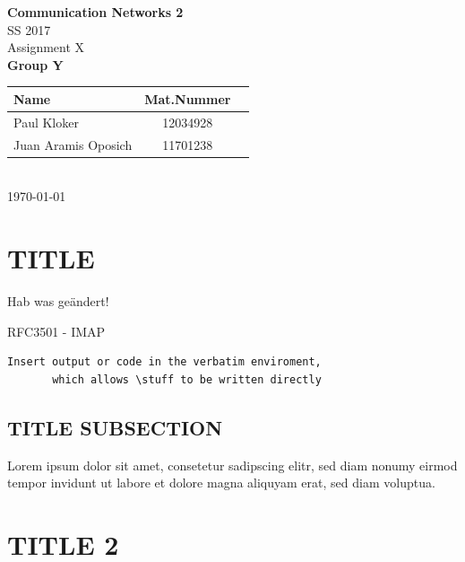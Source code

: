 \documentclass[parskip=full]{scrartcl}
\begin{document}
\begin{titlepage}
    \centering
    \vspace*{2cm}
    {\Huge \textbf{Communication Networks 2}}\\
    SS 2017\\
    \vspace*{1cm}
    {\Large Assignment X}
    \\\vspace*{3cm}
    {\Large \textbf{Group Y}}\\
    \vspace*{1cm}
    {\large 
        \begin{tabular}{l c c}
            Name & Mat.Nummer \\ \hline
            Paul Kloker & 12034928 \\
            Juan Aramis Oposich & 11701238
        \end{tabular}
    }
    \\\vspace*{7cm}
    \today
\end{titlepage}

\section{TITLE}

Hab was geändert!

RFC3501 - IMAP

\begin{verbatim}
Insert output or code in the verbatim enviroment,
       which allows \stuff to be written directly
\end{verbatim}

\subsection{TITLE SUBSECTION}
Lorem ipsum dolor sit amet, consetetur sadipscing elitr, sed diam nonumy eirmod tempor invidunt ut labore et dolore magna aliquyam erat, sed diam voluptua.

\section{TITLE 2}
\end{document}
